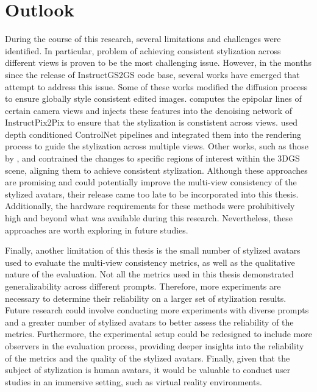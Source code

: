 \section{Outlook}
During the course of this research, several limitations and challenges were identified. In particular, problem of achieving consistent stylization across different views is proven to be the most challenging issue. However, in the months since the release of InstructGS2GS code base, several works have emerged that attempt to address this issue. Some of these works modified the diffusion process to ensure globally style consistent edited images. \Textcite{Chen.2024} computes the epipolar lines of certain camera views and injects these features into the denoising network of InstructPix2Pix to ensure that the stylization is constistent across views. \Textcite{Wu.2024} used depth conditioned ControlNet pipelines and integrated them into the rendering process to guide the stylization across multiple views. Other works, such as those by \Textcite{Zhang.2024}, \Textcite{Wang.2024} and \Textcite{Jaganathan.2024} contrained the changes to specific regions of interest within the 3DGS scene, aligning them to achieve consistent stylization. Although these approaches are promising and could potentially improve the multi-view consistency of the stylized avatars, their release came too late to be incorporated into this thesis. Additionally, the hardware requirements for these methods were prohibitively high and beyond what was available during this research. Nevertheless, these approaches are worth exploring in future studies.

Finally, another limitation of this thesis is the small number of stylized avatars used to evaluate the multi-view consistency metrics, as well as the qualitative nature of the evaluation. Not all the metrics used in this thesis demonstrated generalizability across different prompts. Therefore, more experiments are necessary to determine their reliability on a larger set of stylization results. Future research could involve conducting more experiments with diverse prompts and a greater number of stylized avatars to better assess the reliability of the metrics. Furthermore, the experimental setup could be redesigned to include more observers in the evaluation process, providing deeper insights into the reliability of the metrics and the quality of the stylized avatars. Finally, given that the subject of stylization is human avatars, it would be valuable to conduct user studies in an immersive setting, such as virtual reality environments.
